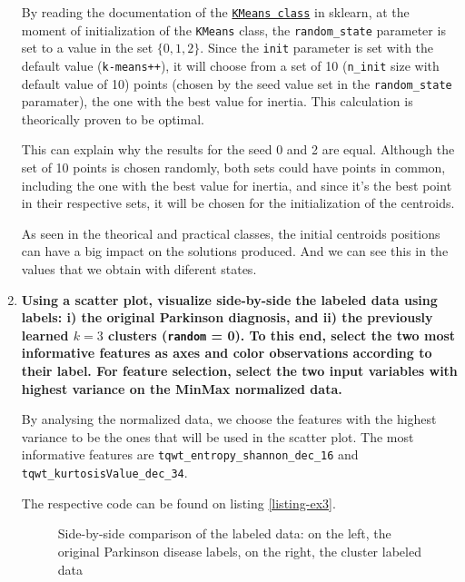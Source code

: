 \documentclass[12pt]{article}
\begin{document}
\begin{enumerate}[leftmargin=\labelsep]
          By reading the documentation of the \href{https://scikit-learn.org/stable/modules/generated/sklearn.cluster.KMeans.html}{\texttt{KMeans class}}
          in sklearn, at the moment of initialization of the \texttt{KMeans} class,
          the \texttt{random\_state} parameter is set to a value in the set $\{0,1,2\}$.
          Since the \texttt{init} parameter is set with the default value (\texttt{k-means++}),
          it will choose from a set of 10 (\texttt{n\_init} size with default value of 10) points (chosen by the seed value set in the \texttt{random\_state} paramater),
          the one with the best value for inertia. This calculation is theorically proven to be optimal.

          This can explain why the results for the seed 0 and 2 are equal.
          Although the set of 10 points is chosen randomly, both sets could have points in common,
          including the one with the best value for inertia, and since it's the best point in their respective sets, it will be chosen for the initialization of the centroids.

          As seen in the theorical and practical classes, the initial centroids positions can have a big impact on the solutions produced.
          And we can see this in the values that we obtain with diferent states.

    \item {\color{questioncolor}\bfseries
          Using a scatter plot, visualize side-by-side the labeled data using labels:
          i) the original Parkinson diagnosis, and ii) the previously learned $k = 3$
          clusters (\texttt{random} = 0).
          To this end, select the two most informative features as axes and color
          observations according to their label.
          For feature selection, select the two input variables with highest
          variance on the MinMax normalized data.
          }\\
          \vspace{0.5em}

          By analysing the normalized data, we choose the features with the highest
          variance to be the ones that will be used in the scatter plot.
          The most informative features are \texttt{tqwt\_entropy\_shannon\_dec\_16}
          and \texttt{tqwt\_kurtosisValue\_dec\_34}.

          The respective code can be found on listing \ref{listing-ex3}.


          \begin{figure}[H]
              \centering
              
              \caption{Side-by-side comparison of the labeled data: on the left, the original Parkinson disease labels, on the right, the cluster labeled data}
              \label{fig:scatterplot-labels}
          \end{figure}


\end{enumerate}
\end{document}
